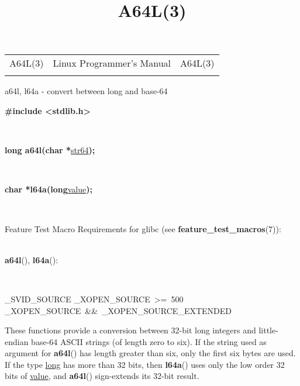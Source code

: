 \documentclass[]{article}
\title{A64L(3)}
\author{}
\date{}
\let\realtextbf=\textbf
\renewcommand{\textbf}[1]{\textcolor{boldcolor}{\realtextbf{#1}}}
\renewcommand{\emph}[1]{\underline{#1}}
\begin{document}
\maketitle

\begin{longtable}[c]{@{}lll@{}}
\toprule\addlinespace
A64L(3) & Linux Programmer's Manual & A64L(3)
\\\addlinespace
\bottomrule
\end{longtable}


a64l, l64a - convert between long and base-64


\textbf{\#include \textless{}stdlib.h\textgreater{}}

~

\textbf{long a64l(char *}\emph{str64}\textbf{);}

~

\textbf{char *l64a(long}\emph{value}\textbf{);}

~

Feature Test Macro Requirements for glibc (see
\textbf{feature\_test\_macros}(7)): \\

~

\textbf{a64l}(), \textbf{l64a}():

~

\_SVID\_SOURCE \textbar{}\textbar{} \_XOPEN\_SOURCE~\textgreater{}=~500
\textbar{}\textbar{} \_XOPEN\_SOURCE~\&\&~\_XOPEN\_SOURCE\_EXTENDED


These functions provide a conversion between 32-bit long integers and
little-endian base-64 ASCII strings (of length zero to six). If the
string used as argument for \textbf{a64l}() has length greater than six,
only the first six bytes are used. If the type \emph{long} has more than
32 bits, then \textbf{l64a}() uses only the low order 32 bits of
\emph{value}, and \textbf{a64l}() sign-extends its 32-bit result.
\end{document}
